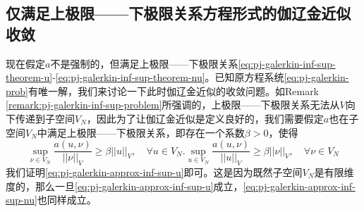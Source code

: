 \begin{subappendices}
\subsection{仅满足上极限——下极限关系方程形式的伽辽金近似收敛}
\label{sec:pj-galerkin-convergence-infsup}
现在假定$a$不是强制的，但满足上极限——下极限关系\eqref{eq:pj-galerkin-inf-sup-theorem-u}-\eqref{eq:pj-galerkin-inf-sup-theorem-nu}。已知原方程系统\eqref{eq:pj-galerkin-prob}有唯一解，我们来讨论一下此时伽辽金近似的收敛问题。如Remark \ref{remark:pj-galerkin-inf-sup-problem}所强调的，上极限——下极限关系无法从$V$向下传递到子空间$V_N$，因此为了让伽辽金近似是定义良好的，我们需要假定$a$也在子空间$V_N$中满足上极限——下极限关系，即存在一个系数$\beta > 0$，使得
\begin{subequations}
  \begin{equation}
    \label{eq:pj-galerkin-approx-inf-sup-u}
    \sup_{\nu \in V_N} \frac{a(u,\nu)}{||\nu||_{V}} \ge \beta ||u||_{V}, \quad \forall u \in V_N.
  \end{equation}
  \begin{equation}
    \label{eq:pj-galerkin-approx-inf-sup-nu}
    \sup_{u \in V_N} \frac{a(u,\nu)}{||u||_{V}} \ge \beta ||\nu||_{V}, \quad \forall \nu \in V_N
  \end{equation}
\end{subequations}
我们证明\eqref{eq:pj-galerkin-approx-inf-sup-u}即可。这是因为既然子空间$V_N$是有限维度的，那么一旦\eqref{eq:pj-galerkin-approx-inf-sup-u}成立，\eqref{eq:pj-galerkin-approx-inf-sup-nu}也同样成立。


\end{subappendices}
